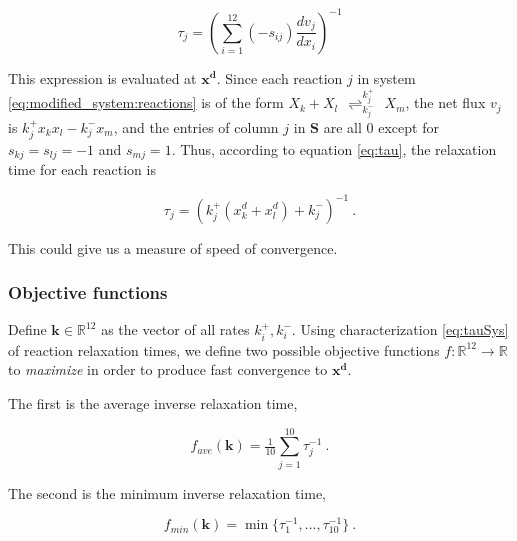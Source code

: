         \begin{equation}
        \tau_j = \left( \sum_{i=1}^{12} (-s_{ij}) \frac{d v_j}{d x_i}
        \right)^{-1} \label{eq:tau}
        \end{equation}

        This expression is evaluated at $\mathbf{x^d}$.
        Since each reaction $j$ in system \eqref{eq:modified_system:reactions} is of
        the form $X_k + X_l
        ~~{\mathop{\rightleftharpoons}_{k_j^-}^{k_j^+}}~~ X_m$, the net flux
        $v_j$ is $k_j^+ x_k x_l - k_j^- x_m$, and the entries of column $j$
        in $\mathbf{S}$ are all $0$ except for $s_{kj} = s_{lj} = -1$ and
        $s_{mj} = 1$. Thus, according to equation \eqref{eq:tau}, the
        relaxation time for each reaction is

        \begin{equation}
            \tau_j = (k_j^+(x_k^d + x_l^d) + k_j^-)^{-1}~. \label{eq:tauSys}
        \end{equation}

        This could give us a measure of speed of convergence.


        \subsubsection{Objective functions} %
        \label{ssub:objective_functions}

        Define $\mathbf{k} \in \mathbb{R}^{12}$ as the vector of all rates
        $k_i^+, k_i^-$. Using characterization \eqref{eq:tauSys} of reaction
        relaxation times, we define two possible objective functions
        $f:\mathbb{R}^{12} \rightarrow \mathbb{R}$ to {\it maximize} in
        order to produce fast convergence to $\mathbf{x^d}$.

        The first is the average inverse relaxation time,

        \begin{equation}
            f_{ave}(\mathbf{k}) = \tfrac{1}{10} \sum_{j=1}^{10} \tau_j^{-1}~.
        \end{equation}

        The second is the minimum inverse relaxation time,

        \begin{equation}
            f_{min}(\mathbf{k}) = \min \{ \tau_1^{-1}, \ldots, \tau_{10}^{-1}\}~.
        \end{equation}

